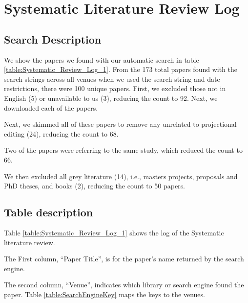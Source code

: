 \chapter{Systematic Literature Review Log} 
\label{Appendix:SLRLog}

\section*{Search Description} 
We show the papers we found with our automatic search in table \ref{table:Systematic_Review_Log_1}.
From the 173 total papers found with the search strings across all venues when we used the search string and date restrictions, there were 100 unique papers.
First, we excluded those not in English (5) or unavailable to us (3), reducing the count to 92.
Next, we downloaded each of the papers.

Next, we skimmed all of these papers to remove any unrelated to projectional editing (24), reducing the count to 68.

Two of the papers were referring to the same study, which reduced the count to 66.

We then excluded all grey literature (14), i.e., masters projects, proposals and PhD theses, and books (2), reducing the count to 50 papers.

\section*{Table description}
Table \ref{table:Systematic_Review_Log_1} shows the log of the Systematic literature review.

The First column, ``Paper Title'', is for the paper's name returned by the search engine.

The second column, ``Venue'', indicates which library or search engine found the paper.
Table \ref{table:SearchEngineKey} maps the keys to the venues.

